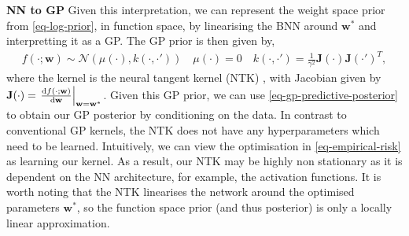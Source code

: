 \documentclass{article}
\newcommand{\dataset}{\ensuremath{\mathcal{D}}}
\newcommand{\transitionFn}{\ensuremath{f}}
\newcommand{\transitionParams}{\ensuremath{\mathbf{w}}}
\begin{document}
\textbf{NN to GP}
Given this interpretation, we can represent the weight space prior from \cref{eq-log-prior}, in
function space, by linearising the BNN around $\transitionParams^{*}$ and interpretting it as a GP.
The GP prior is then given by,
\begin{align} \label{eq-laplace-approx-function-space}
  f(\cdot ;\transitionParams) \sim \mathcal{N} \left( \mu(\cdot), k(\cdot, \cdot') \right) \quad
  \mu(\cdot)
  = 0 \quad
  k(\cdot, \cdot')
  = \frac{1}{\gamma^{2}} \mathbf{J}(\cdot) \mathbf{J}(\cdot')^{T},
\end{align}
where the kernel is the neural tangent kernel (NTK) \citep{immerImprovingPredictionsBayesian2021},
with Jacobian given by $\mathbf{J}(\cdot) = \odv{\transitionFn(\cdot; \transitionParams)}{\transitionParams}_{\transitionParams=\transitionParams^{*}}$.
Given this GP prior, we can use \cref{eq-gp-predictive-posterior} to obtain our GP posterior by conditioning on the data.
In contrast to conventional GP kernels, the NTK does not have any hyperparameters which need to be learned.
Intuitively, we can view the optimisation in \cref{eq-empirical-risk} as learning our kernel.
As a result, our NTK may be highly non stationary as it is dependent on the NN architecture, for example, the activation functions.
It is worth noting that the NTK linearises the network around the optimised parameters $\transitionParams^{*}$,
so the function space prior (and thus posterior) is only a locally linear approximation.
\end{document}
